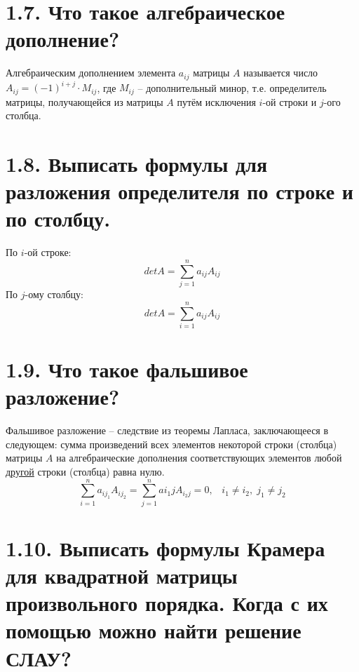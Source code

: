 \documentclass{article}
\begin{document}
\section*{\LARGE 1.7. Что такое алгебраическое дополнение?  }

Алгебраическим дополнением элемента $a_{ij}$ матрицы $A$ называется число 
\newline $A_{ij} = (-1)^{i + j}\cdot M_{ij}$, где $M_{ij}$ -- дополнительный минор, т.е. определитель матрицы, получающейся из матрицы $A$ путём исключения $i$-ой строки и $j$-ого столбца.

\section*{\LARGE 1.8. Выписать формулы для разложения определителя по строке и по столбцу. }

По $i$-ой строке:
$$
detA = \sum_{j = 1}^n a_{ij}A_{ij}
$$
По $j$-ому столбцу:
$$
detA = \sum_{i = 1}^n a_{ij}A_{ij}
$$

\section*{\LARGE 1.9. Что такое фальшивое разложение?  }

Фальшивое разложение -- следствие из теоремы Лапласа, заключающееся в следующем: сумма произведений всех элементов некоторой строки (столбца) матрицы $A$ на алгебраические дополнения соответствующих элементов любой \underline{другой} строки (столбца) равна нулю.
$$
\sum_{i = 1}^n a_{ij_1}A_{ij_2} = \sum_{j = 1}^n a{i_1j}A_{i_2j} = 0, \;\;\;i_1 \ne i_2, \; j_1 \ne j_2
$$

\section*{\LARGE 1.10. Выписать формулы Крамера для квадратной матрицы произвольного порядка. Когда с их помощью можно найти решение СЛАУ?  }
\end{document}
